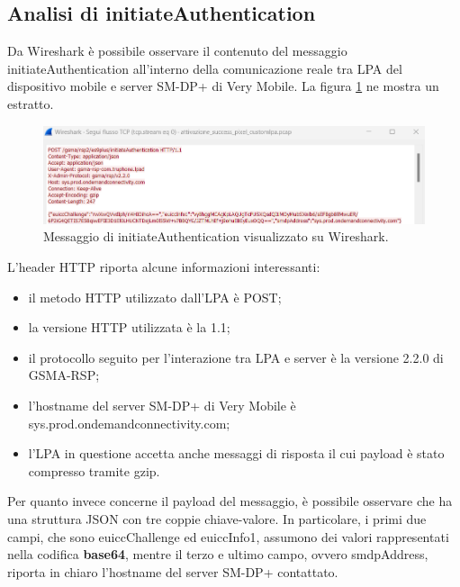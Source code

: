 \documentclass[10pt, oneside]{book}
\begin{document}
\subsection{Analisi di initiateAuthentication}
Da Wireshark è possibile osservare il contenuto del messaggio initiateAuthentication all'interno della comunicazione reale tra LPA del dispositivo mobile e server SM-DP+ di Very Mobile. La figura \ref{fig:msg1-stream-pcap} ne mostra un estratto.\\
\begin{figure}
\includegraphics[width=\linewidth]{msg1-stream-pcap.png}
\caption{Messaggio di initiateAuthentication visualizzato su Wireshark.}
\label{fig:msg1-stream-pcap}
\end{figure}
L'header HTTP riporta alcune informazioni interessanti:
\begin{itemize}
\item il metodo HTTP utilizzato dall'LPA è POST;
\item la versione HTTP utilizzata è la 1.1;
\item il protocollo seguito per l'interazione tra LPA e server è la versione 2.2.0 di GSMA-RSP;
\item l'hostname del server SM-DP+ di Very Mobile è sys.prod.ondemandconnectivity.com;
\item l'LPA in questione accetta anche messaggi di risposta il cui payload è stato compresso tramite gzip.
\end{itemize}
Per quanto invece concerne il payload del messaggio, è possibile osservare che ha una struttura JSON con tre coppie chiave-valore. In particolare, i primi due campi, che sono euiccChallenge ed euiccInfo1, assumono dei valori rappresentati nella codifica \textbf{base64}, mentre il terzo e ultimo campo, ovvero smdpAddress, riporta in chiaro l'hostname del server SM-DP+ contattato.
\end{document}
